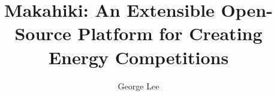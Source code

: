 \documentclass[11pt,draft,thesis,proposal]{uhthesis2e}
\begin{document}
\title{Makahiki: An Extensible Open-Source Platform for Creating Energy Competitions}
\author{George Lee}

\maketitle

\begin{frontmatter}

\signaturepage

\copyrightpage







\tableofcontents


\listoffigures

\end{frontmatter}
\end{document}
